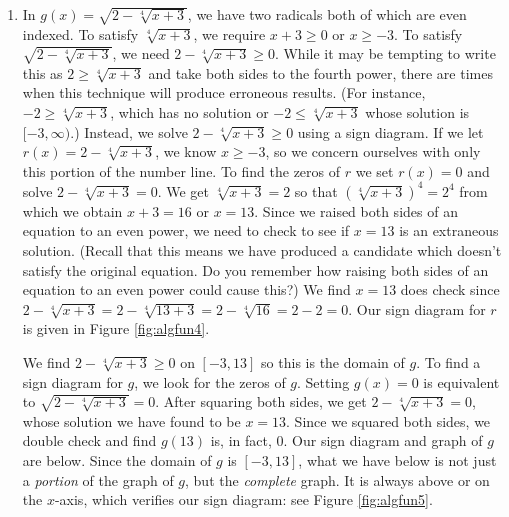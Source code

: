 {\begin{enumerate}
\item In $g(x) = \sqrt{2-\sqrt[4]{x+3}}$, we have two radicals both of which are even indexed.  To satisfy $\sqrt[4]{x+3}$, we require $x+3 \geq 0$ or $x \geq -3$.  To satisfy $ \sqrt{2-\sqrt[4]{x+3}}$, we need $2-\sqrt[4]{x+3} \geq 0$.  While it may be tempting to write this as $2 \geq \sqrt[4]{x+3}$ and take both sides to the fourth power, there are times when this technique will produce erroneous results. (For instance, $-2 \geq \sqrt[4]{x+3}$, which has no solution or  $-2 \leq \sqrt[4]{x+3}$ whose solution is $[-3,\infty)$.) Instead, we solve $2-\sqrt[4]{x+3} \geq 0$ using a sign diagram.  If we let $r(x) = 2-\sqrt[4]{x+3}$, we know $x \geq -3$, so we  concern ourselves with only this portion of the number line.  To find the zeros of $r$ we set $r(x) =0$ and solve  $2-\sqrt[4]{x+3}=0$.  We get $\sqrt[4]{x+3} = 2$ so that $\left(\sqrt[4]{x+3}\right)^4 = 2^4$ from which we obtain $x+3 = 16$ or $x=13$.  Since we raised both sides of an equation to an even power, we need to check to see if $x=13$ is an extraneous solution. (Recall that this means we have produced a candidate which doesn't satisfy the original equation.  Do you remember how raising both sides of an equation to an even power could cause this?)  We find $x=13$ does check since $2-\sqrt[4]{x+3} = 2 - \sqrt[4]{13+3} = 2 - \sqrt[4]{16} = 2 - 2 = 0$. Our sign diagram for $r$ is given in Figure \ref{fig:algfun4}.





We find $2-\sqrt[4]{x+3} \geq 0$ on $[-3,13]$ so this is the domain of $g$.  To find a sign diagram for $g$, we look for the zeros of $g$.  Setting $g(x) = 0$ is equivalent to $\sqrt{2-\sqrt[4]{x+3}}=0$.  After squaring both sides, we get $2-\sqrt[4]{x+3} = 0$, whose solution we have found to be $x=13$.   Since we squared both sides, we double check and find $g(13)$ is, in fact, $0$. Our sign diagram and graph of $g$ are below.  Since the domain of $g$ is $[-3,13]$, what we have below is not just a \textit{portion} of the graph of $g$, but the \textit{complete} graph.  It is always above or on the $x$-axis, which verifies our sign diagram: see Figure \ref{fig:algfun5}.



\end{enumerate}}
